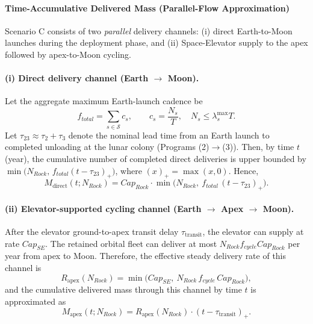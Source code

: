 ﻿\documentclass{mcmthesis}
\begin{document}
\paragraph{Time-Accumulative Delivered Mass (Parallel-Flow Approximation)}
\label{sec:scenarioC_parallel_flow}

Scenario C consists of two \emph{parallel} delivery channels:
(i) direct Earth-to-Moon launches during the deployment phase, and
(ii) Space-Elevator supply to the apex followed by apex-to-Moon cycling.

\paragraph{(i) Direct delivery channel (Earth $\rightarrow$ Moon).}
Let the aggregate maximum Earth-launch cadence be
\begin{equation}
f_{total}=\sum_{s\in\mathcal{S}} c_s, \qquad c_s=\frac{N_s}{T},\quad N_s\le \lambda_s^{\max}T.
\end{equation}
Let $\tau_{23}\approx \tau_2+\tau_3$ denote the nominal lead time from an Earth launch
to completed unloading at the lunar colony (Programs (2)$\rightarrow$(3)).
Then, by time $t$ (year), the cumulative number of completed direct deliveries is
upper bounded by $\min\!\big(N_{Rock},\, f_{total}(t-\tau_{23})_+\big)$, where
$(x)_+=\max(x,0)$. Hence,
\begin{equation}
M_{\text{direct}}(t;N_{Rock})
=
Cap_{Rock}\cdot \min\!\Big(N_{Rock},\ f_{total}\,(t-\tau_{23})_+\Big).
\label{eq:mdirect}
\end{equation}

\paragraph{(ii) Elevator-supported cycling channel (Earth $\rightarrow$ Apex $\rightarrow$ Moon).}
After the elevator ground-to-apex transit delay $\tau_{\text{transit}}$, the elevator
can supply at rate $Cap_{SE}$. The retained orbital fleet can deliver at most
$N_{Rock}f_{cycle}Cap_{Rock}$ per year from apex to Moon. Therefore, the effective
steady delivery rate of this channel is
\begin{equation}
R_{\text{apex}}(N_{Rock})
=
\min\!\Big(Cap_{SE},\ N_{Rock}\,f_{cycle}\,Cap_{Rock}\Big),
\label{eq:rapex}
\end{equation}
and the cumulative delivered mass through this channel by time $t$ is approximated as
\begin{equation}
M_{\text{apex}}(t;N_{Rock})
=
R_{\text{apex}}(N_{Rock})\cdot (t-\tau_{\text{transit}})_+.
\label{eq:mapex}
\end{equation}
\end{document}
